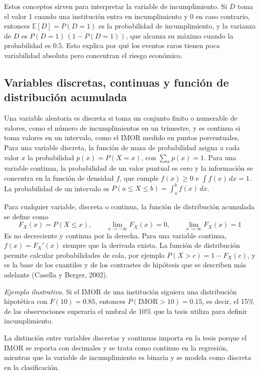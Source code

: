 Estos conceptos sirven para interpretar la variable de incumplimiento. Si $D$ toma el valor 1 cuando una institución entra en incumplimiento y 0 en caso contrario, entonces $\mathbb{E}[D]=P(D=1)$ es la probabilidad de incumplimiento, y la varianza de $D$ es $P(D=1)\,(1-P(D=1))$, que alcanza su máximo cuando la probabilidad es $0.5$. Esto explica por qué los eventos raros tienen poca variabilidad absoluta pero concentran el riesgo económico.

\subsection{Variables discretas, continuas y función de distribución acumulada}
Una variable aleatoria es discreta si toma un conjunto finito o numerable de valores, como el número de incumplimientos en un trimestre, y es continua si toma valores en un intervalo, como el IMOR medido en puntos porcentuales. Para una variable discreta, la función de masa de probabilidad asigna a cada valor $x$ la probabilidad $p(x)=P(X=x)$, con $\sum_x p(x)=1$. Para una variable continua, la probabilidad de un valor puntual es cero y la información se concentra en la función de densidad $f$, que cumple $f(x)\geq 0$ e $\int f(x)\,dx=1$. La probabilidad de un intervalo es $P(a\leq X\leq b)=\int_a^b f(x)\,dx$.

Para cualquier variable, discreta o continua, la función de distribución acumulada se define como
\begin{equation}
F_X(x)=P(X\leq x), \qquad \lim_{x\to-\infty}F_X(x)=0, \qquad \lim_{x\to\infty}F_X(x)=1
\label{eq:cdf}
\end{equation}
Es no decreciente y continua por la derecha. Para una variable continua, $f(x)=F_X'(x)$ siempre que la derivada exista. La función de distribución permite calcular probabilidades de cola, por ejemplo $P(X>c)=1-F_X(c)$, y es la base de los cuantiles y de los contrastes de hipótesis que se describen más adelante (Casella y Berger, 2002).

\textit{Ejemplo ilustrativo.} Si el IMOR de una institución siguiera una distribución hipotética con $F(10)=0.85$, entonces $P(\text{IMOR}>10)=0.15$, es decir, el 15\% de las observaciones superaría el umbral de 10\% que la tesis utiliza para definir incumplimiento.

La distinción entre variables discretas y continuas importa en la tesis porque el IMOR se reporta con decimales y se trata como continuo en la regresión, mientras que la variable de incumplimiento es binaria y se modela como discreta en la clasificación.

